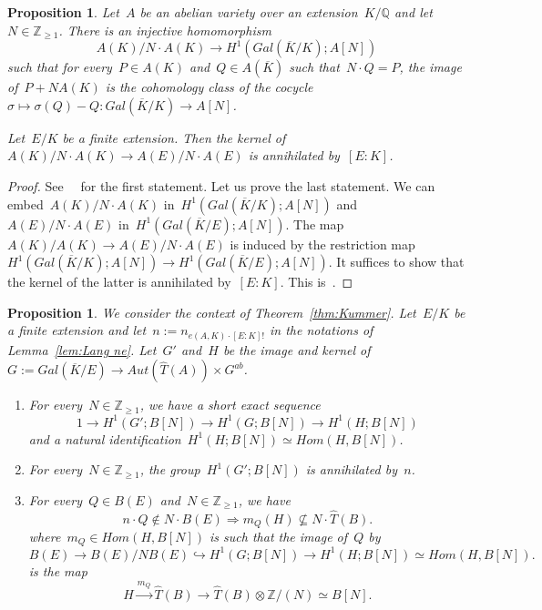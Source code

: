 \documentclass[12pt]{amsart}
\newtheorem{proposition}[theorem]{Proposition}
\newcommand{\Z}{{\mathbb Z}}
\newcommand{\Q}{{\mathbb Q}}
\newcommand{\ol}{\overline}
\newcommand{\wh}{\widehat}
\newcommand{\tens}{\otimes}
\begin{document}
\begin{proposition}\label{prop:411}
Let~$A$ be an abelian variety over an extension~$K/\Q$ and let~$N\in\Z_{\geq1}$. There is an injective homomorphism
\[
A(K)/N\cdot A(K)\to H^1(Gal(\ol{K}/K); A[N])
\]
such that for every~$P\in A(K)$ and~$Q\in A(\ol{K})$ such that~$N\cdot Q=P$, the image of~$P+NA(K)$ is the cohomology class of the cocycle~$\sigma\mapsto \sigma(Q)-Q:Gal(\ol{K}/K)\to A[N]$. 

Let~$E/K$ be a finite extension. Then the kernel of~$A(K)/N\cdot A(K)\to A(E)/N\cdot A(E)$ is annihilated by~$[E:K]$.
\end{proposition}
\begin{proof}See~~\cite[App. 2, Lem.~F]{Hindry} for the first statement. Let us prove the last statement. We can embed~$A(K)/N\cdot A(K)$ in~$H^1(Gal(\ol{K}/K); A[N])$ and~$A(E)/N\cdot A(E)$ in~$H^1(Gal(\ol{K}/E); A[N])$. The map~$A(K)/A(K)\to A(E)/N\cdot A(E)$ is induced by the restriction map~$H^1(Gal(\ol{K}/K); A[N])\to H^1(Gal(\ol{K}/E); A[N])$. It suffices to show that the kernel of the latter is annihilated by~$[E:K]$. This is~\cite[I\S\, 2.4, Prop. 9]{LNM5}.
\end{proof}
\begin{proposition}\label{prop:412}
 We consider the context of Theorem~\ref{thm:Kummer}. Let~$E/K$ be a finite extension and let~$n:=n_{e(A,K)\cdot [E:K]!}$ in the notations of Lemma~\ref{lem:Lang ne}. Let~$G'$ and~$H$ be the image and kernel of~$G:=Gal(\ol{K}/E)\to Aut(\wh{T}(A))\times G^{ab}$. 
\begin{enumerate}
\item \label{4121}
For every~$N\in\Z_{\geq1}$, we have a short exact sequence
\begin{equation}\label{eq:truccc}
1\to H^1(G'; B[N]) \to H^1(G; B[N])\to H^1(H;B[N])
\end{equation}
and a natural identification~$H^1(H;B[N])\simeq Hom(H,B[N])$.
\item \label{4122}
For every~$N\in\Z_{\geq1}$, the group~$H^1(G'; B[N])$ is annihilated by~$n$.
\item \label{4123}
For every~$Q\in B(E)$ and~$N\in\Z_{\geq1}$, we have
\[
n\cdot Q\not\in N\cdot B(E)\Rightarrow m_Q(H)\not\subseteq N\cdot \wh{T}(B).
\]
where~$m_Q\in Hom(H,B[N])$ is such that the image of~$Q$ by
\[
B(E)\to B(E)/NB(E)\hookrightarrow H^1(G;B[N])\to H^1(H;B[N])\simeq Hom(H,B[N]).
\]
is the map
\[
H\xrightarrow{m_Q} \wh{T}(B)\to \wh{T}(B)\tens \Z/(N)\simeq B[N].
\]
\end{enumerate}
\end{proposition}
\end{document}
